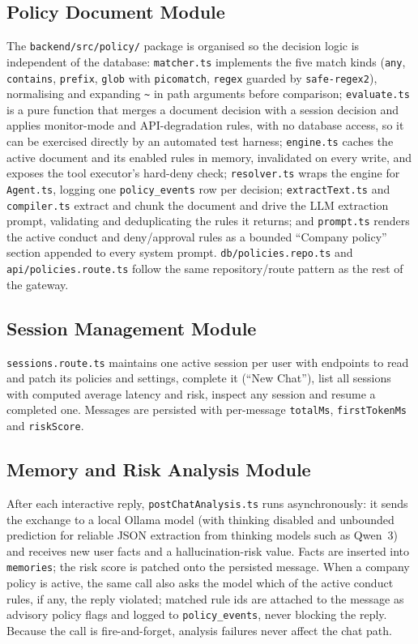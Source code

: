 \documentclass[12pt,a4paper,oneside]{report}
\begin{document}
\subsection{Policy Document Module}
The \texttt{backend/src/policy/} package is organised so the
decision logic is independent of the database: \texttt{matcher.ts}
implements the five match kinds (\texttt{any}, \texttt{contains},
\texttt{prefix}, \texttt{glob} with \texttt{picomatch}, \texttt{regex}
guarded by \texttt{safe-regex2}), normalising and expanding
\texttt{\textasciitilde} in path arguments before comparison;
\texttt{evaluate.ts} is a pure function that merges a document
decision with a session decision and applies monitor-mode and
API-degradation rules, with no database access, so it can be exercised
directly by an automated test harness; \texttt{engine.ts} caches the
active document and its enabled rules in memory, invalidated on every
write, and exposes the tool executor's hard-deny check;
\texttt{resolver.ts} wraps the engine for \texttt{Agent.ts}, logging
one \texttt{policy\_events} row per decision; \texttt{extractText.ts}
and \texttt{compiler.ts} extract and chunk the document and drive the
LLM extraction prompt, validating and deduplicating the rules it
returns; and \texttt{prompt.ts} renders the active conduct and
deny/approval rules as a bounded ``Company policy'' section appended
to every system prompt. \texttt{db/policies.repo.ts} and
\texttt{api/policies.route.ts} follow the same repository/route
pattern as the rest of the gateway.

\subsection{Session Management Module}
\texttt{sessions.route.ts} maintains one active session per user with
endpoints to read and patch its policies and settings, complete it
(``New Chat''), list all sessions with computed average latency and
risk, inspect any session and resume a completed one. Messages are
persisted with per-message \texttt{totalMs}, \texttt{firstTokenMs} and
\texttt{riskScore}.

\subsection{Memory and Risk Analysis Module}
After each interactive reply, \texttt{postChatAnalysis.ts} runs
asynchronously: it sends the exchange to a local Ollama model
(with thinking disabled and unbounded prediction for reliable JSON
extraction from thinking models such as Qwen~3) and receives new user
facts and a hallucination-risk value. Facts are inserted into
\texttt{memories}; the risk score is patched onto the persisted
message. When a company policy is active, the same call also asks the
model which of the active conduct rules, if any, the reply violated;
matched rule ids are attached to the message as advisory policy flags
and logged to \texttt{policy\_events}, never blocking the reply.
Because the call is fire-and-forget, analysis failures never affect
the chat path.
\end{document}
